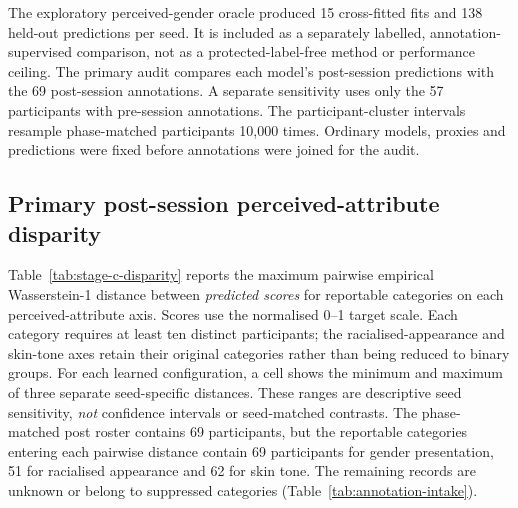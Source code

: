 The exploratory perceived-gender oracle produced 15 cross-fitted fits and 138 held-out
predictions per seed. It is included as a separately labelled, annotation-supervised comparison,
not as a protected-label-free method or performance ceiling. The primary audit compares each
model's post-session predictions with the 69 post-session annotations. A separate sensitivity
uses only the 57 participants with pre-session annotations. The participant-cluster intervals
resample phase-matched participants 10,000 times. Ordinary models, proxies and predictions
were fixed before annotations were joined for the audit.

\subsection{Primary post-session perceived-attribute disparity}

Table~\ref{tab:stage-c-disparity} reports the maximum pairwise empirical Wasserstein-1 distance
between \emph{predicted scores} for reportable
categories on each perceived-attribute axis. Scores use the normalised 0--1 target scale. Each
category requires at least ten distinct participants; the racialised-appearance and skin-tone
axes retain their original categories rather than being reduced to binary groups. For each
learned configuration, a cell shows the minimum and maximum of three separate seed-specific
distances. These ranges are descriptive seed sensitivity, \emph{not} confidence intervals or
seed-matched contrasts. The phase-matched post roster contains 69 participants, but the
reportable categories entering each pairwise distance contain 69 participants for gender
presentation, 51 for racialised appearance and 62 for skin tone. The remaining records are
unknown or belong to suppressed categories (Table~\ref{tab:annotation-intake}).


